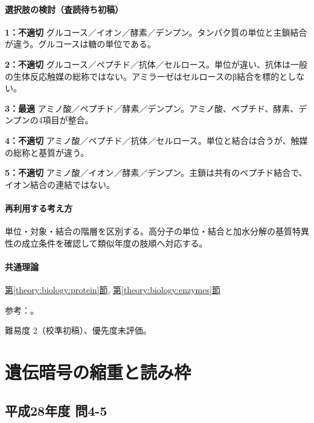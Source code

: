 \paragraph{選択肢の検討（査読待ち初稿）}\mbox{}\par

\noindent\textbf{1：不適切} グルコース／イオン／酵素／デンプン。タンパク質の単位と主鎖結合が違う。グルコースは糖の単位である。\par

\noindent\textbf{2：不適切} グルコース／ペプチド／抗体／セルロース。単位が違い、抗体は一般の生体反応触媒の総称ではない。アミラーゼはセルロースのβ結合を標的としない。\par

\noindent\textbf{3：最適} アミノ酸／ペプチド／酵素／デンプン。アミノ酸、ペプチド、酵素、デンプンの4項目が整合。\par

\noindent\textbf{4：不適切} アミノ酸／ペプチド／抗体／セルロース。単位と結合は合うが、触媒の総称と基質が違う。\par

\noindent\textbf{5：不適切} アミノ酸／イオン／酵素／デンプン。主鎖は共有のペプチド結合で、イオン結合の連結ではない。\par

\paragraph{再利用する考え方} 単位・対象・結合の階層を区別する。高分子の単位・結合と加水分解の基質特異性の成立条件を確認して類似年度の肢順へ対応する。

\paragraph{共通理論} \hyperref[theory:biology:protein]{第\ref*{theory:biology:protein}節}, \hyperref[theory:biology:enzymes]{第\ref*{theory:biology:enzymes}節}

\par 参考：\cite{mit_amino,iubmb_amylase}。

\par 難易度 2（校準初稿）、優先度未評価。

\section{遺伝暗号の縮重と読み枠}

\subsection{平成28年度 問4-5}
\label{q:h28-reg-basic-4-5}

